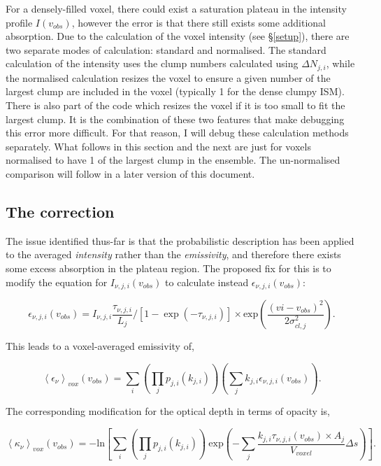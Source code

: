 \documentclass[a4paper]{article}
\begin{document}
    For a densely-filled voxel, there could exist a saturation plateau in the intensity profile \(I(v_{obs})\), however the error is that there still exists some additional absorption.
    Due to the calculation of the voxel intensity (see \S \ref{setup}), there are two separate modes of calculation: standard and normalised.
    The standard calculation of the intensity uses the clump numbers calculated using \(\Delta N_{j,i}\), while the normalised calculation resizes the voxel to ensure a given number of the largest clump are included in the voxel (typically 1 for the dense clumpy ISM).
    There is also part of the code which resizes the voxel if it is too small to fit the largest clump.
    It is the combination of these two features that make debugging this error more difficult.
    For that reason, I will debug these calculation methods separately.
    What follows in this section and the next are just for voxels normalised to have 1 of the largest clump in the ensemble.
    The un-normalised comparison will follow in a later version of this document.

    \subsection{The correction}

    The issue identified thus-far is that the probabilistic description has been applied to the averaged \textit{intensity} rather than the \textit{emissivity}, and therefore there exists some excess absorption in the plateau region.
    The proposed fix for this is to modify the equation for \(I_{\nu, j, i} (v_{obs})\) to calculate instead \(\epsilon_{\nu, j, i} (v_{obs})\):

    \[
    \epsilon_{\nu,j,i} (v_{obs}) = I_{\nu,j,i} \frac{\tau_{\nu,j,i}} {L_{j}} / [ 1 - \exp(-\tau_{\nu,j,i}) ] \times \mathrm{exp}(\frac{(vi - v_{obs})^2}{2 \sigma_{cl,j}^2}).
    \]

    This leads to a voxel-averaged emissivity of,

    \[
    \left< \epsilon_\nu \right>_{vox} (v_{obs}) = \sum_i \left( \prod_j p_{j,i}(k_{j,i}) \right) \left( \sum_j k_{j,i} \epsilon_{\nu,j,i} (v_{obs}) \right).
    \]

    The corresponding modification for the optical depth in terms of opacity is,

    \[
    \left< \kappa_\nu \right>_{vox} (v_{obs}) = -\mathrm{ln} \left[ \sum_i \left( \prod_j p_{j,i}(k_{j,i}) \right) \ \mathrm{exp} \left( - \sum_j \frac{k_{j,i} \tau_{\nu,j,i} (v_{obs}) \times A_{j}}{V_{voxel}} \Delta s \right) \right].
    \]
\end{document}
